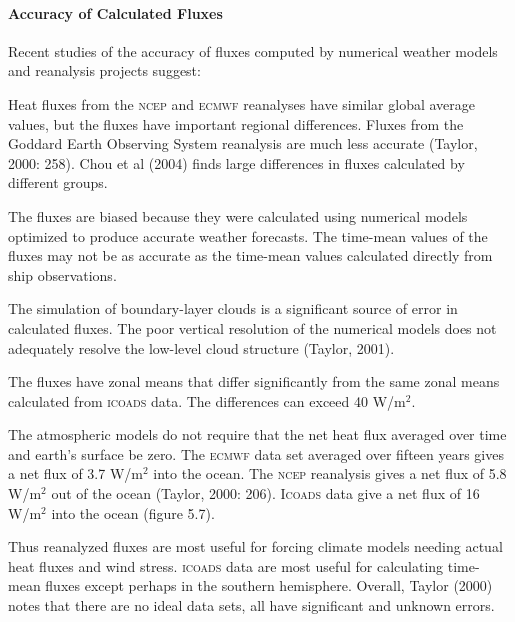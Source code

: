 \paragraph{Accuracy of Calculated Fluxes}
Recent studies of the accuracy of
fluxes computed by numerical weather models and reanalysis projects
suggest:
\begin{enumerate}
\vitem
Heat fluxes from the \textsc{ncep} and \textsc{ecmwf} reanalyses have
similar global average values, but the fluxes have important regional
differences. Fluxes from the Goddard Earth Observing System reanalysis
are much less accurate (Taylor, 2000: 258). Chou et al (2004) finds
large differences in fluxes calculated by different groups.

\vitem
The fluxes are biased because they were calculated using numerical
models optimized to produce accurate weather forecasts. The time-mean
values of the fluxes may not be as accurate as the time-mean values
calculated directly from ship observations.

\vitem
The simulation of boundary-layer clouds is a significant source of
error in calculated fluxes. The poor vertical resolution of the
numerical models does not adequately resolve the low-level cloud
structure (Taylor, 2001).

\vitem
The fluxes have zonal means that differ significantly from the same
zonal means calculated from \textsc{icoads} data. The
differences can exceed 40 W/m$^2$.

\vitem
The atmospheric models do not require that the net heat
flux averaged over time and earth's surface be
zero. The \textsc{ecmwf} data set averaged over fifteen years gives a
net flux of 3.7 W/m$^2$ into the ocean. The \textsc{ncep} reanalysis
gives a net flux of 5.8 W/m$^2$ out of the ocean (Taylor, 2000:
206). \textsc{Icoads} data give a net flux of 16 W/m$^2$ into the
ocean (figure 5.7).
\end{enumerate}
Thus reanalyzed fluxes are most useful for forcing climate models
needing actual heat fluxes and
wind stress.  \textsc{icoads}
data are most useful for calculating time-mean fluxes except
perhaps in the southern hemisphere. Overall, Taylor (2000) notes that
there are no ideal data sets, all have significant and unknown errors.


